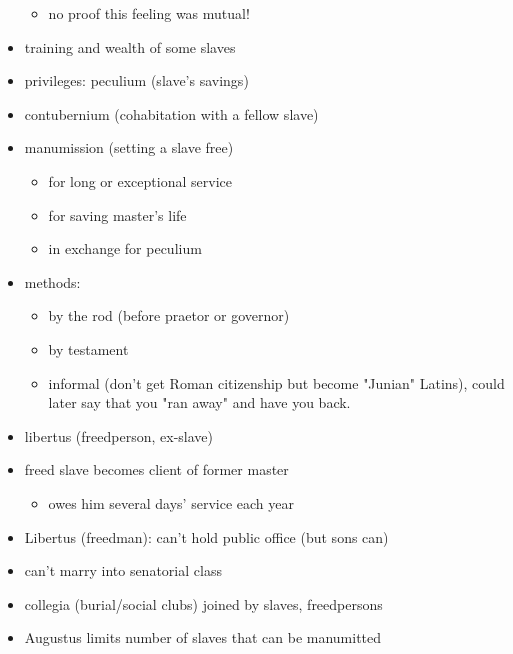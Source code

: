 \documentclass[12pt, twoside]{article}
\begin{document}
\begin{itemize}
	\begin{itemize}
	\item no proof this feeling was mutual!
	\end{itemize}
\item training and wealth of some slaves
\item privileges: peculium (slave's savings)
\item contubernium (cohabitation with a fellow slave)
\item manumission (setting a slave free)
	\begin{itemize}
	\item for long or exceptional service
	\item for saving master's life
	\item in exchange for peculium
	\end{itemize}
\item methods: 
	\begin{itemize}
	\item by the rod (before praetor or governor)
	\item by testament
	\item informal (don't get Roman citizenship but become "Junian" Latins), could later say that you "ran away" and have you back.
	\end{itemize}
\item libertus (freedperson, ex-slave)
\item freed slave becomes client of former master
	\begin{itemize}
	\item owes him several days' service each year
	\end{itemize}
\item Libertus (freedman): can't hold public office (but sons can)
\item can't marry into senatorial class
\item collegia (burial/social clubs) joined by slaves, freedpersons
\item Augustus limits number of slaves that can be manumitted
\end{itemize}
\end{document}
